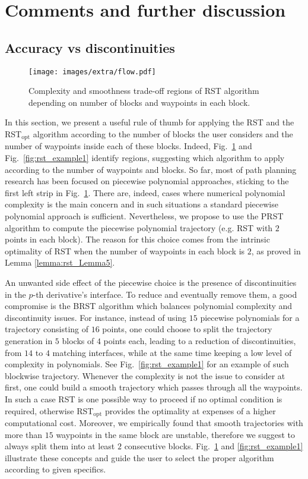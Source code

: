 \section{Comments and further discussion}
\label{subsec:rst_comment}
\subsection{Accuracy vs discontinuities}
\begin{figure}
\texttt{[image: images/extra/flow.pdf]}
\centering
\vspace{-0.1em}
\caption{Complexity and smoothness trade-off regions of RST algorithm depending on number of blocks and waypoints in each block.}
\vspace{-1.0em}
\label{fig:rst_regions}
\end{figure}
In this section, we present a useful rule of thumb for applying the RST and the RST$_{\text{opt}}$ algorithm according to the number of blocks the user considers and the number of waypoints inside each of these blocks. 
Indeed, Fig.~\ref{fig:rst_regions} and Fig.~\ref{fig:rst_example1} identify regions, suggesting which algorithm to apply according to the number of waypoints and blocks.
So far, most of path planning research has been focused on piecewise polynomial approaches, sticking to the first left strip in Fig.~\ref{fig:rst_regions}. There are, indeed, cases where numerical polynomial complexity is the main concern and in such situations a standard piecewise polynomial approach is sufficient. Nevertheless, we propose to use the PRST algorithm to compute the piecewise polynomial trajectory (e.g. RST with $2$ points in each block). The reason for this choice comes from the intrinsic optimality of RST when the number of waypoints in each block is $2$, as proved in Lemma \ref{lemma:rst_Lemma5}.

An unwanted side effect of the piecewise choice is the presence of discontinuities in the $p$-th derivative's interface. To reduce and eventually remove them, a good compromise is the BRST algorithm which balances polynomial complexity and discontinuity issues. For instance, instead of using $15$ piecewise polynomials for a trajectory consisting of $16$ points, one could choose to split the trajectory generation in $5$ blocks of $4$ points each, leading to a reduction of discontinuities, from $14$ to $4$ matching interfaces, while at the same time keeping a low level of complexity in polynomials. See Fig.~\ref{fig:rst_example1} for an example of such blockwise trajectory.
Whenever the complexity is not the issue to consider at first, one could build a smooth trajectory which passes through all the waypoints. In such a case RST is one possible way to proceed if no optimal condition is required, otherwise RST$_{\text{opt}}$ provides the optimality at expenses of a higher computational cost. 
Moreover, we empirically found that smooth trajectories with more than $15$ waypoints in the same block are unstable, therefore we suggest to always split them into at least $2$ consecutive blocks.
Fig.~\ref{fig:rst_regions} and \ref{fig:rst_example1} illustrate these concepts and guide the user to select the proper algorithm according to given specifics.


